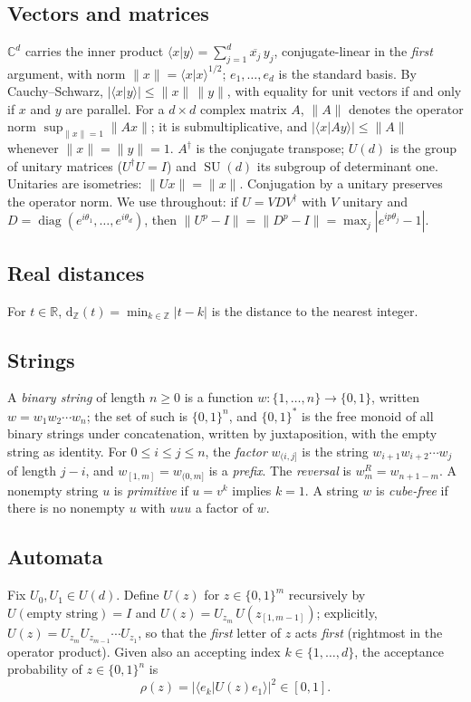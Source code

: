 \documentclass[11pt]{amsart}
\theoremstyle{definition}
\theoremstyle{remark}
\newcommand{\R}{\mathbb{R}}
\newcommand{\C}{\mathbb{C}}
\newcommand{\Z}{\mathbb{Z}}
\newcommand{\dz}[1]{\mathrm{d}_{\Z}(#1)}
\DeclareMathOperator{\SU}{SU}
\begin{document}
\subsection*{Vectors and matrices}
$\C^d$ carries the inner product
$\langle x|y\rangle=\sum_{j=1}^d\overline{x_j}\,y_j$, conjugate-linear
in the \emph{first} argument, with norm $\|x\|=\langle
x|x\rangle^{1/2}$; $e_1,\dots,e_d$ is the standard basis. By
Cauchy--Schwarz, $|\langle x|y\rangle|\le\|x\|\,\|y\|$, with equality
for unit vectors if and only if $x$ and $y$ are parallel. For a
$d\times d$ complex matrix $A$, $\|A\|$ denotes the operator norm
$\sup_{\|x\|=1}\|Ax\|$; it is submultiplicative, and
$|\langle x|Ay\rangle|\le\|A\|$ whenever $\|x\|=\|y\|=1$. $A^\dagger$
is the conjugate transpose; $U(d)$ is the group of unitary matrices
($U^\dagger U=I$) and $\SU(d)$ its subgroup of determinant one.
Unitaries are isometries: $\|Ux\|=\|x\|$. Conjugation by a unitary
preserves the operator norm. We use throughout: if $U=VDV^\dagger$
with $V$ unitary and $D=\operatorname{diag}
(e^{i\theta_1},\dots,e^{i\theta_d})$, then
$\|U^p-I\|=\|D^p-I\|=\max_j|e^{ip\theta_j}-1|$.

\subsection*{Real distances}
For $t\in\R$, $\dz{t}=\min_{k\in\Z}|t-k|$ is the distance to the
nearest integer.

\subsection*{Strings}
A \emph{binary string} of length $n\ge0$ is a function
$w\colon\{1,\dots,n\}\to\{0,1\}$, written $w=w_1w_2\cdots w_n$; the set
of such is $\{0,1\}^n$, and $\{0,1\}^*$ is the free monoid of all
binary strings under concatenation, written by juxtaposition, with
the empty string as identity. For $0\le i\le j\le n$, the
\emph{factor} $w_{(i,j]}$ is the string $w_{i+1}w_{i+2}\cdots w_j$ of
length $j-i$, and $w_{[1,m]}=w_{(0,m]}$ is a \emph{prefix}. The
\emph{reversal} is $w^R_m=w_{n+1-m}$. A nonempty string $u$ is
\emph{primitive} if $u=v^k$ implies $k=1$. A string $w$ is
\emph{cube-free} if there is no nonempty $u$ with $uuu$ a factor of
$w$.

\subsection*{Automata}
Fix $U_0,U_1\in U(d)$. Define $U(z)$ for $z\in\{0,1\}^m$ recursively
by $U(\text{empty string})=I$ and
$U(z)=U_{z_m}\,U(z_{[1,m-1]})$; explicitly,
$U(z)=U_{z_m}U_{z_{m-1}}\cdots U_{z_1}$, so that the \emph{first}
letter of $z$ acts \emph{first} (rightmost in the operator
product). Given also an accepting index $k\in\{1,\dots,d\}$, the
acceptance probability of $z\in\{0,1\}^n$ is
\[
  \rho(z)=\bigl|\langle e_k|U(z)e_1\rangle\bigr|^2\in[0,1].
\]
\end{document}
